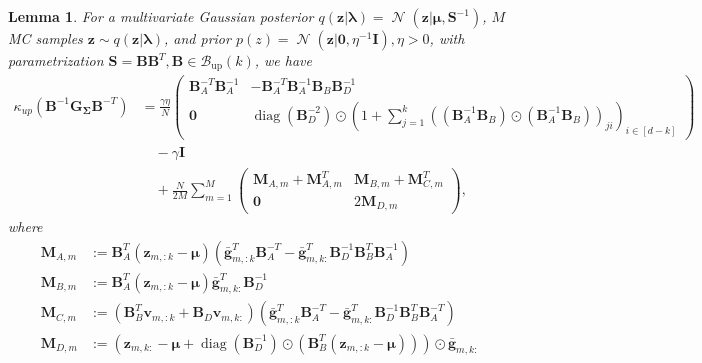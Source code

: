 \documentclass[a4paper, 11pt, oneside]{scrartcl}
\theoremstyle{break}
\newtheorem{lemma}{Lemma}[section]
\DeclareMathOperator{\Normal}{\mathcal{N}}
\DeclareMathOperator{\diag}{diag}
\newcommand{\matr}[1]{\boldsymbol{#1}}
\newcommand{\set}[1]{\mathcal{#1}}
\numberwithin{equation}{section}
\begin{document}
				\begin{lemma}
					For a multivariate Gaussian posterior $q(\matr{z} | \matr{\lambda}) = \Normal(\matr{z} | \matr{\mu}, \matr{S}^{-1})$, $M$ MC samples $\matr{z} \sim q(\matr{z} | \matr{\lambda})$, and prior $p(z) = \Normal(\matr{z} | \matr{0}, \eta^{-1} \matr{I}), \eta > 0$, with parametrization $\matr{S} = \matr{B} \matr{B}^T, \matr{B} \in \set{B}_{\text{up}}(k)$, we have
					\begin{align*}
						\kappa_{up}(\matr{B}^{-1} \matr{G_{\Sigma}} \matr{B}^{-T}) &= \frac{\gamma \eta}{N}\begin{pmatrix} \matr{B}_A^{-T} \matr{B}_A^{-1} & -\matr{B}_A^{-T} \matr{B}_A^{-1} \matr{B}_B \matr{B}_D^{-1} \\ \matr{0} & \diag(\matr{B}_D^{-2}) \odot (1 + \sum_{j=1}^k ((\matr{B}_A^{-1} \matr{B}_B) \odot (\matr{B}_A^{-1} \matr{B}_B))_{ji})_{i \in [d-k]} \end{pmatrix} \\
						&\quad - \gamma \matr{I} \\
						&\quad + \frac{N}{2 M} \sum_{m=1}^M \begin{pmatrix} \matr{M}_{A, m} + \matr{M}_{A, m}^T & \matr{M}_{B, m} + \matr{M}_{C, m}^T \\ \matr{0} & 2\matr{M}_{D, m} \end{pmatrix},
					\end{align*}
					where
					\begin{align*}
						\matr{M}_{A, m} &:= \matr{B}_A^T (\matr{z}_{m, :k} - \matr{\mu}) (\matr{\bar{g}}_{m, :k}^T \matr{B}_A^{-T} - \matr{\bar{g}}_{m, k:}^T \matr{B}_D^{-1} \matr{B}_B^T \matr{B}_A^{-1} ) \\
						\matr{M}_{B, m} &:= \matr{B}_A^T (\matr{z}_{m, :k} - \matr{\mu}) \matr{\bar{g}}_{m, k:}^T \matr{B}_D^{-1} \\
						\matr{M}_{C, m} &:= (\matr{B}_B^T \matr{v}_{m, :k} + \matr{B}_D \matr{v}_{m, k:}) (\matr{\bar{g}}_{m, :k}^T \matr{B}_A^{-T} - \matr{\bar{g}}_{m, k:}^T \matr{B}_D^{-1} \matr{B}_B^T \matr{B}_A^{-T}) \\
						\matr{M}_{D, m} &:= (\matr{z}_{m, k:} - \matr{\mu} + \diag(\matr{B}_D^{-1}) \odot (\matr{B}_B^T (\matr{z}_{m, :k} - \matr{\mu}))) \odot \matr{\bar{g}}_{m, k:}
					\end{align*}
					\label{lemma:kappa_up}
				\end{lemma}
\end{document}
